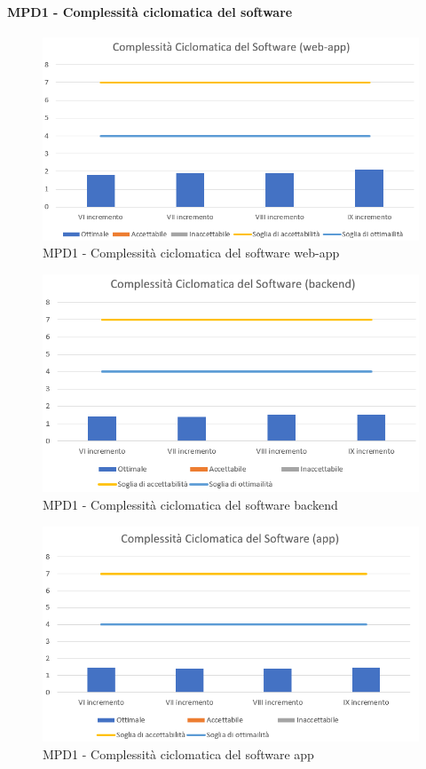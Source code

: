   \paragraph{MPD1 - Complessità ciclomatica del software}
  \begin{figure}[h!]
    \centering
      \includegraphics[scale=1]{Immagini/CicloCompl WAA.PNG}
    \caption{MPD1 - Complessità ciclomatica del software web-app}
  \end{figure}

  \begin{figure}[h!]
    \centering
      \includegraphics[scale=1]{Immagini/CicloCompl BEA.PNG}
    \caption{MPD1 - Complessità ciclomatica del software backend}
  \end{figure}

  \begin{figure}[h!]
    \centering
      \includegraphics[scale=1]{Immagini/CicloCompl APPA.PNG}
    \caption{MPD1 - Complessità ciclomatica del software app}
  \end{figure}

